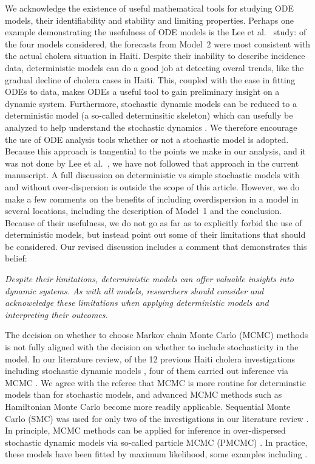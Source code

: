 \documentclass[11pt]{article}
\newcommand\article[1]{{\color{blue} \vspace{1mm}\hspace{0.25in}\parbox{6in}{\em #1}}}
\begin{document}
\article{\editDiscussionFour}

We acknowledge the existence of useful mathematical tools for studying ODE models, their identifiability and stability and limiting properties.
Perhaps one example demonstrating the usefulness of ODE models is the Lee et al.~\cite{lee20} study: of the four models considered, the forecasts from Model~2 were most consistent with the actual cholera situation in Haiti.
Despite their inability to describe incidence data, deterministic models can do a good job at detecting overal trends, like the gradual decline of cholera cases in Haiti.
This, coupled with the ease in fitting ODEs to data, makes ODEs a useful tool to gain preliminary insight on a dynamic system.
Furthermore, stochastic dynamic models can be reduced to a deterministic model (a so-called determinsitic skeleton) which can usefully be analyzed to help understand the stochastic dynamics \cite{coulson04}.
We therefore encourage the use of ODE analysis tools whether or not a stochastic model is adopted.
Because this approach is tangential to the points we make in our analysis, and it was not done by Lee et al.~\cite{lee20}, we have not followed that approach in the current manuscript.
A full discussion on deterministic vs simple stochastic models with and without over-dispersion is outside the scope of this article. 
However, we do make a few comments on the benefits of including overdispersion in a model in several locations, including the description of Model~1 and the conclusion. 
Because of their usefulness, we do not go as far as to explicitly forbid the use of deterministic models, but instead point out some of their limitations that should be considered. 
Our revised discussion includes a comment that demonstrates this belief: 

\article{Despite their limitations, deterministic models can offer valuable insights into dynamic systems. As with all models, researchers should consider and acknoweledge these limitations when applying deterministic models and interpreting their outcomes.}

The decision on whether to choose Markov chain Monte Carlo (MCMC) methods is not fully aligned with the decision on whether to include stochasticity in the model.
In our literature review, of the 12 previous Haiti cholera investigations including stochastic dynamic models \cite{kirpich17,lee20,pasetto18,mukandavire13,kirpich16,lewnard16,kunkel17,mukandavire15,sallah17,azman12,azman15}, four of them carried out inference via MCMC \cite{pasetto18,lewnard16,sallah17,azman12}.
We agree with the referee that MCMC is more routine for determinstic models than for stochastic models, and advanced MCMC methods such as Hamiltonian Monte Carlo become more readily applicable.
Sequential Monte Carlo (SMC) was used for only two of the investigations in our literature review \cite{lee20,azman15}.
In principle, MCMC methods can be applied for inference in over-dispersed stochastic dynamic models via so-called particle MCMC (PMCMC) \cite{andrieu10}.
In practice, these models have been fitted by maximum likelihood, some examples including \cite{lemaitre19,fox22,molodecky23,pons-salort18,subramanian20,stocks20}.
\end{document}
